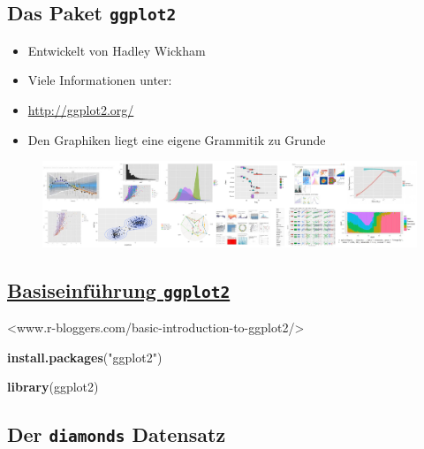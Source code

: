 \documentclass[]{article}
\newenvironment{Shaded}{\begin{snugshade}}{\end{snugshade}}
\newcommand{\KeywordTok}[1]{\textcolor[rgb]{0.13,0.29,0.53}{\textbf{{#1}}}}
\newcommand{\StringTok}[1]{\textcolor[rgb]{0.31,0.60,0.02}{{#1}}}
\newcommand{\NormalTok}[1]{{#1}}
\providecommand{\tightlist}{%
  \setlength{\itemsep}{0pt}\setlength{\parskip}{0pt}}
\begin{document}
\subsection{\texorpdfstring{Das Paket
\texttt{ggplot2}}{Das Paket ggplot2}}\label{das-paket-ggplot2}

\begin{itemize}
\tightlist
\item
  Entwickelt von Hadley Wickham
\item
  Viele Informationen unter:
\item
  \url{http://ggplot2.org/}
\item
  Den Graphiken liegt eine eigene Grammitik zu Grunde
\end{itemize}

\begin{figure}[htbp]
\centering
\includegraphics{figure/GalleryGGplot2.PNG}
\caption{}
\end{figure}

\subsection{\texorpdfstring{\href{www.r-bloggers.com/basic-introduction-to-ggplot2/}{Basiseinführung
\texttt{ggplot2}}}{Basiseinführung ggplot2}}\label{basiseinfuhrung-ggplot2}

\textless{}www.r-bloggers.com/basic-introduction-to-ggplot2/\textgreater{}

\begin{Shaded}
\begin{Highlighting}[]
\KeywordTok{install.packages}\NormalTok{(}\StringTok{"ggplot2"}\NormalTok{)}
\end{Highlighting}
\end{Shaded}

\begin{Shaded}
\begin{Highlighting}[]
\KeywordTok{library}\NormalTok{(ggplot2)}
\end{Highlighting}
\end{Shaded}

\subsection{\texorpdfstring{Der \texttt{diamonds}
Datensatz}{Der diamonds Datensatz}}\label{der-diamonds-datensatz}
\end{document}
